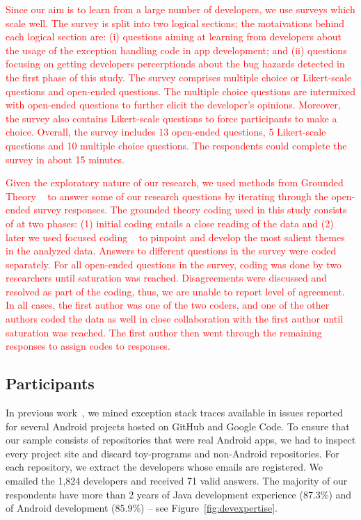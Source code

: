 \textcolor{red}{Since our aim is to learn from a large number of developers, we use surveys which scale well.}
\textcolor{red}{The survey is split into two logical sections; the motaivations behind each logical section are: 
(i) questions aiming at learning from developers about the usage of the exception handling code in app development;  and 
(ii) questions focusing on getting developers percerptionds about the bug hazards detected in the first phase of this study.
The survey comprises multiple choice or Likert-scale questions and open-ended questions. The multiple choice questions are intermixed with open-ended questions to further elicit the developer's opinions. Moreover, the survey also contains Likert-scale questions to force participants to make a choice. Overall, the survey includes 13 open-ended questions, 5 Likert-scale questions and 10 multiple choice questions. The respondents could complete the survey in about 15 minutes.}

\textcolor{red}{Given the exploratory nature of our research, we used methods from Grounded Theory ~\cite{charmaz2006} to answer some of our research questions by iterating through the open-ended survey responses. The grounded theory coding used in this study consists of at two phases: (1) initial coding entails a close reading of the data and (2) later we used focused coding ~\cite{charmaz2006} to pinpoint and develop the most salient themes ~\cite{charmaz2006} in the analyzed data. Answers to different questions in the survey were coded separately. For all open-ended questions in the survey, coding was done by two researchers until saturation was reached. Disagreements were discussed and resolved as part of the coding, thus, we are unable to report level of agreement. In all cases, the first author was one of the two coders, and one of the other authors coded the data as well in close collaboration with the first author until saturation was reached. The first author then went through the remaining responses to assign codes to responses.}


\subsection{Participants}

 In previous work~\cite{coelhoetal15}, we mined exception stack traces available in issues reported for several Android projects hosted on GitHub and Google Code. To ensure that our sample consists of repositories that were real Android apps, we had to inspect every project site and discard toy-programs and non-Android repositories. For each repository, we extract the developers whose emails are registered. We emailed the 1,824 developers and received 71 valid answers. The majority of our respondents have more than 2 years of Java development experience (87.3\%) and of Android development (85.9\%) -- see Figure~\ref{fig:devexpertise}.


